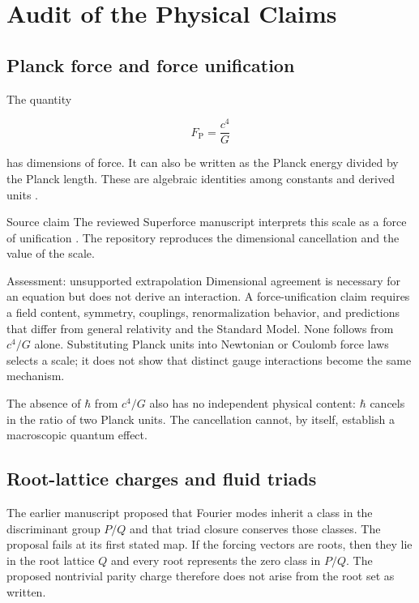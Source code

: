 \chapter{Audit of the Physical Claims}
\label{ch:physical-claims}

\section{Planck force and force unification}

The quantity

\begin{equation}
  F_{\mathrm{P}} = \frac{c^4}{G}
\end{equation}

has dimensions of force. It can also be written as the Planck energy divided by
the Planck length. These are algebraic identities among constants and derived
units \citep{planck1899natural}.

\begin{evidence}{Source claim}
The reviewed Superforce manuscript interprets this scale as a force of
unification \citep{pais2023superforce}. The repository reproduces the
dimensional cancellation and the value of the scale.
\end{evidence}

\begin{evidence}{Assessment: unsupported extrapolation}
Dimensional agreement is necessary for an equation but does not derive an
interaction. A force-unification claim requires a field content, symmetry,
couplings, renormalization behavior, and predictions that differ from general
relativity and the Standard Model. None follows from $c^4/G$ alone. Substituting
Planck units into Newtonian or Coulomb force laws selects a scale; it does not
show that distinct gauge interactions become the same mechanism.
\end{evidence}

The absence of $\hbar$ from $c^4/G$ also has no independent physical content:
$\hbar$ cancels in the ratio of two Planck units. The cancellation cannot, by
itself, establish a macroscopic quantum effect.

\section{Root-lattice charges and fluid triads}

The earlier manuscript proposed that Fourier modes inherit a class in the
discriminant group $P/Q$ and that triad closure conserves those classes. The
proposal fails at its first stated map. If the forcing vectors are roots, then
they lie in the root lattice $Q$ and every root represents the zero class in
$P/Q$. The proposed nontrivial parity charge therefore does not arise from the
root set as written.

